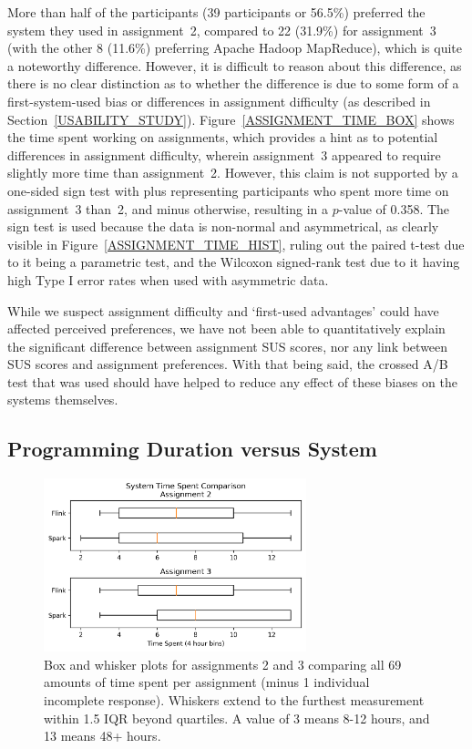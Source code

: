   More than half of the participants (39 participants or 56.5\%) preferred the system they used in assignment~2, compared to 22 (31.9\%) for assignment~3 (with the other 8 (11.6\%) preferring Apache Hadoop MapReduce), which is quite a noteworthy difference. However, it is difficult to reason about this difference, as there is no clear distinction as to whether the difference is due to some form of a first-system-used bias or differences in assignment difficulty (as described in Section~\ref{USABILITY_STUDY}). Figure~\ref{ASSIGNMENT_TIME_BOX} shows the time spent working on assignments, which provides a hint as to potential differences in assignment difficulty, wherein assignment~3 appeared to require slightly more time than assignment~2. However, this claim is not supported by a one-sided sign test with plus representing participants who spent more time on assignment~3 than~2, and minus otherwise, resulting in a $p$-value of 0.358. The sign test is used because the data is non-normal and asymmetrical, as clearly visible in Figure~\ref{ASSIGNMENT_TIME_HIST}, ruling out the paired t-test due to it being a parametric test, and the Wilcoxon signed-rank test due to it having high Type I error rates when used with asymmetric data.
  
  While we suspect assignment difficulty and `first-used advantages' could have affected perceived preferences, we have not been able to quantitatively explain the significant difference between assignment SUS scores, nor any link between SUS scores and assignment preferences. With that being said, the crossed A/B test that was used should have helped to reduce any effect of these biases on the systems themselves.


\subsection{Programming Duration versus System}
\label{INF_PROG_DURATION_VS_SYSTEM}
  
  \begin{figure}[ht]
    \centering
    \includegraphics[width=3in]{./figs/assignment-system-time-comparison-boxplot.png}
    \caption{Box and whisker plots for assignments 2 and 3 comparing all 69 amounts of time spent per assignment (minus 1 individual incomplete response). Whiskers extend to the furthest measurement within 1.5 IQR beyond quartiles. A value of 3 means 8-12 hours, and 13 means 48+ hours.}
    \label{ASSIGNMENT_SYSTEM_TIME_BOX}
  \end{figure}
  
